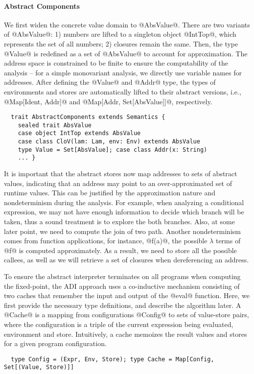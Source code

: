 \paragraph{Abstract Components}

We first widen the concrete value domain to @AbsValue@. There are two variants of
@AbsValue@: 1) numbers are lifted to a singleton object @IntTop@, which represents
the set of all numbers; 2) closures remain the same. Then, the type @Value@ is
redefined as a set of @AbsValue@ to account for approximation.  The address
space is constrained to be finite to ensure the computability of the analysis --
for a simple monovariant analysis, we directly use variable names for
addresses. After defining the @Value@ and @Addr@ type, the types of
environments and stores are automatically lifted to their abstract versions,
i.e., @Map[Ident, Addr]@ and @Map[Addr, Set[AbsValue]]@, respectively.  
\begin{lstlisting}
  trait AbstractComponents extends Semantics {
    sealed trait AbsValue
    case object IntTop extends AbsValue
    case class CloV(lam: Lam, env: Env) extends AbsValue
    type Value = Set[AbsValue]; case class Addr(x: String)
    ... }
\end{lstlisting}

It is important that the abstract stores now map addresses to sets of abstract
values, indicating that an address may point to an over-approximated set of
runtime values.  This can be justified by the approximation nature and
nondeterminism during the analysis.  For example, when analyzing a
conditional expression, we may not have enough information to decide which
branch will be taken, thus a sound treatment is to explore the both branches.
Also, at some later point, we need to compute the join of two path.  Another
nondeterminism comes from function applications, for instance, @f(a)@, the
possible $\lambda$ terms of @f@ is computed approximately.  As a
result, we need to store all the possible callees, as well as we will
retrieve a set of closures when dereferencing an address. 

To ensure the abstract interpreter terminates on all programs when computing
the fixed-point, the ADI approach uses a co-inductive mechanism consisting of
two caches that remember the input and output of the @eval@ function.
Here, we first provide the necessary type definitions, and describe
the algorithm later. A @Cache@ is a mapping from configurations @Config@ to
sets of value-store pairs, where the configuration is a triple of the current
expression being evaluated, environment and store. Intuitively, a cache memoizes
the result values and stores for a given program configuration.
\begin{lstlisting}
  type Config = (Expr, Env, Store); type Cache = Map[Config, Set[(Value, Store)]]
\end{lstlisting}

